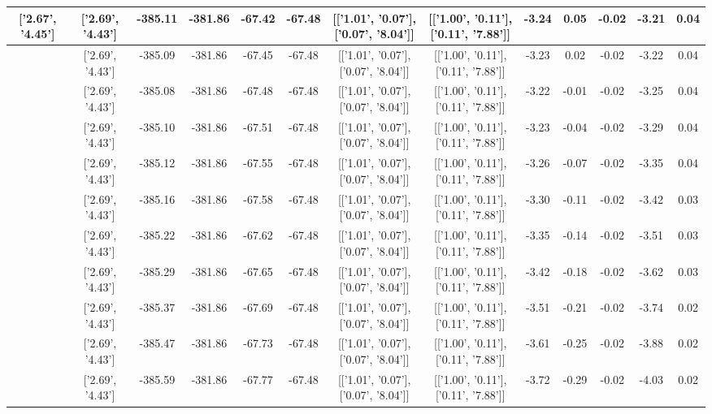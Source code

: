 \begin{table}[htbp]
\begin{adjustbox}{angle=90}
\begin{tabular}{|c|c|c|c|c|c|c|c|c|c|c|c|c|}
 ['2.67', '4.45'] & ['2.69', '4.43'] & -385.11 & -381.86 & -67.42 & -67.48 & [['1.01', '0.07'], ['0.07', '8.04']] & [['1.00', '0.11'], ['0.11', '7.88']] & -3.24 & 0.05 & -0.02 & -3.21 & 0.04\\ \hline
 ['2.68', '4.44'] & ['2.69', '4.43'] & -385.09 & -381.86 & -67.45 & -67.48 & [['1.01', '0.07'], ['0.07', '8.04']] & [['1.00', '0.11'], ['0.11', '7.88']] & -3.23 & 0.02 & -0.02 & -3.22 & 0.04\\ \hline
 ['2.69', '4.43'] & ['2.69', '4.43'] & -385.08 & -381.86 & -67.48 & -67.48 & [['1.01', '0.07'], ['0.07', '8.04']] & [['1.00', '0.11'], ['0.11', '7.88']] & -3.22 & -0.01 & -0.02 & -3.25 & 0.04\\ \hline
 ['2.71', '4.43'] & ['2.69', '4.43'] & -385.10 & -381.86 & -67.51 & -67.48 & [['1.01', '0.07'], ['0.07', '8.04']] & [['1.00', '0.11'], ['0.11', '7.88']] & -3.23 & -0.04 & -0.02 & -3.29 & 0.04\\ \hline
 ['2.72', '4.42'] & ['2.69', '4.43'] & -385.12 & -381.86 & -67.55 & -67.48 & [['1.01', '0.07'], ['0.07', '8.04']] & [['1.00', '0.11'], ['0.11', '7.88']] & -3.26 & -0.07 & -0.02 & -3.35 & 0.04\\ \hline
 ['2.73', '4.41'] & ['2.69', '4.43'] & -385.16 & -381.86 & -67.58 & -67.48 & [['1.01', '0.07'], ['0.07', '8.04']] & [['1.00', '0.11'], ['0.11', '7.88']] & -3.30 & -0.11 & -0.02 & -3.42 & 0.03\\ \hline
 ['2.74', '4.41'] & ['2.69', '4.43'] & -385.22 & -381.86 & -67.62 & -67.48 & [['1.01', '0.07'], ['0.07', '8.04']] & [['1.00', '0.11'], ['0.11', '7.88']] & -3.35 & -0.14 & -0.02 & -3.51 & 0.03\\ \hline
 ['2.76', '4.40'] & ['2.69', '4.43'] & -385.29 & -381.86 & -67.65 & -67.48 & [['1.01', '0.07'], ['0.07', '8.04']] & [['1.00', '0.11'], ['0.11', '7.88']] & -3.42 & -0.18 & -0.02 & -3.62 & 0.03\\ \hline
 ['2.77', '4.40'] & ['2.69', '4.43'] & -385.37 & -381.86 & -67.69 & -67.48 & [['1.01', '0.07'], ['0.07', '8.04']] & [['1.00', '0.11'], ['0.11', '7.88']] & -3.51 & -0.21 & -0.02 & -3.74 & 0.02\\ \hline
 ['2.78', '4.39'] & ['2.69', '4.43'] & -385.47 & -381.86 & -67.73 & -67.48 & [['1.01', '0.07'], ['0.07', '8.04']] & [['1.00', '0.11'], ['0.11', '7.88']] & -3.61 & -0.25 & -0.02 & -3.88 & 0.02\\ \hline
 ['2.79', '4.38'] & ['2.69', '4.43'] & -385.59 & -381.86 & -67.77 & -67.48 & [['1.01', '0.07'], ['0.07', '8.04']] & [['1.00', '0.11'], ['0.11', '7.88']] & -3.72 & -0.29 & -0.02 & -4.03 & 0.02\\ \hline

\end{tabular}
\end{adjustbox}
\end{table}
